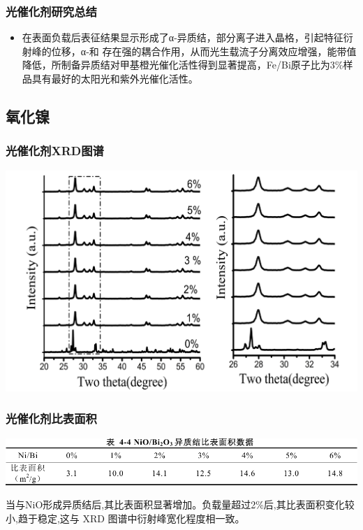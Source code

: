 \documentclass[xetex,compress]{mybeamer}
\begin{document}
\begin{frame}
\frametitle{光催化剂研究总结}
\begin{block}{}
\begin{itemize}
\item 在表面负载后表征结果显示形成了α-异质结，部分离子进入晶格，引起特征衍射峰的位移，α-和 存在强的耦合作用，从而光生载流子分离效应增强，能带值降低，所制备异质结对甲基橙光催化活性得到显著提高，Fe/Bi原子比为3\%样品具有最好的太阳光和紫外光催化活性。
\end{itemize}
\end{block}
\end{frame}


\subsection{氧化镍}
\begin{frame}
\frametitle{光催化剂XRD图谱}
\begin{block}{}
\centering
\includegraphics[width=0.9\linewidth]{figures/氧化镍XRD} 
\end{block}
\end{frame}

\begin{frame}
\frametitle{光催化剂比表面积}
\begin{block}{}
\centering
\includegraphics[width=\linewidth]{figures/氧化镍比表面积} 
\end{block}
\begin{block}{}
当与NiO形成异质结后,其比表面积显著增加。负载量超过2\%后,其比表面积变化较小,趋于稳定,这与 XRD 图谱中衍射峰宽化程度相一致。
\end{block}
\end{frame}
\end{document}
